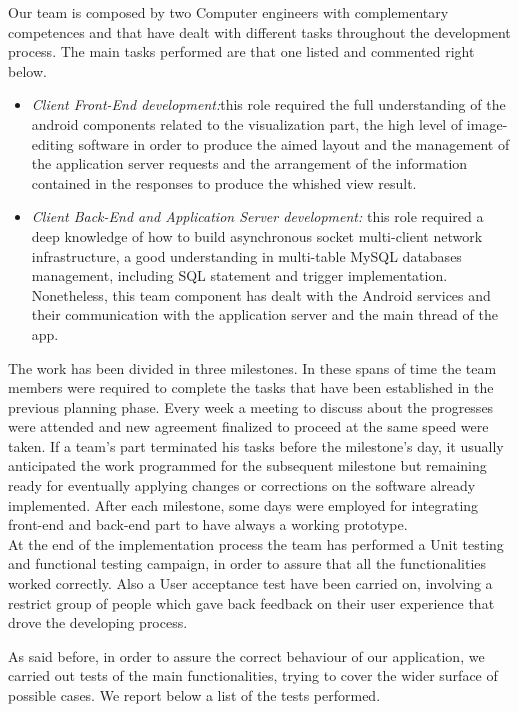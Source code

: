 Our team is composed by two Computer engineers with complementary competences and that have dealt with different tasks throughout the development process. The main tasks performed are that one listed and commented right below.

\begin{itemize}
\item \emph{Client Front-End development:}this role required the full understanding of the android components related to the visualization part, the high level of image-editing software in order to produce the aimed layout and the management of the application server requests and the arrangement of the information contained in the responses to produce the whished view result. 

\item \emph{Client Back-End and Application Server development:} this role required a deep knowledge of how to build asynchronous socket multi-client network infrastructure, a good understanding in multi-table MySQL databases management, including SQL statement and trigger implementation. Nonetheless, this team component has dealt with the Android services and their communication with the application server and the main thread of the app.
\end{itemize}

The work has been divided in three milestones. In these spans of time the team members were required to complete the tasks that have been established in the previous planning phase. Every week a meeting to discuss about the progresses were attended and new agreement finalized to proceed at the same speed were taken. If a team’s part terminated his tasks before the milestone’s day, it usually anticipated the work programmed for the subsequent milestone but remaining ready for eventually applying changes or corrections on the software already implemented. After each milestone, some days were employed for integrating front-end and back-end part to have always a working prototype. \\
At the end of the implementation process the team has performed a Unit testing and functional testing campaign, in order to assure that all the functionalities worked correctly. Also a User acceptance test have been carried on, involving a restrict group of people which gave back feedback on their user experience that drove the developing process.

\newpage
{}
As said before, in order to assure the correct behaviour of our application, we carried out tests of the main functionalities, trying to cover the wider surface of possible cases. We report below a list of the tests performed.


